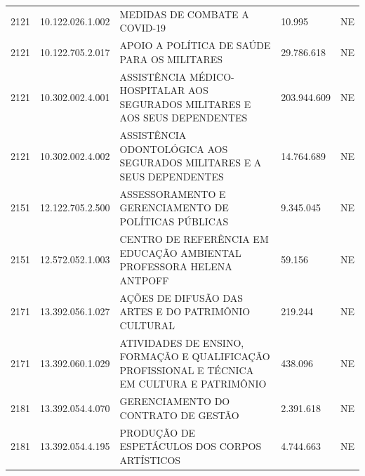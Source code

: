 \documentclass{article}
\begin{document}
\begin{longtable}[c]{m{1cm}|m{2cm}|m{10cm}|m{2cm}|m{1cm}}
\multicolumn{1}{C{1cm}|}{2121} & \multicolumn{1}{C{2cm}|}{10.122.026.1.002} & \multicolumn{1}{L{10cm}|}{MEDIDAS DE COMBATE A COVID-19} & \multicolumn{1}{R{2cm}|}{10.995} & \multicolumn{1}{C{1cm}}{NE} \\
\multicolumn{1}{C{1cm}|}{2121} & \multicolumn{1}{C{2cm}|}{10.122.705.2.017} & \multicolumn{1}{L{10cm}|}{APOIO A POLÍTICA DE SAÚDE PARA OS MILITARES} & \multicolumn{1}{R{2cm}|}{29.786.618} & \multicolumn{1}{C{1cm}}{NE} \\
\multicolumn{1}{C{1cm}|}{2121} & \multicolumn{1}{C{2cm}|}{10.302.002.4.001} & \multicolumn{1}{L{10cm}|}{ASSISTÊNCIA MÉDICO-HOSPITALAR AOS SEGURADOS MILITARES E AOS SEUS DEPENDENTES} & \multicolumn{1}{R{2cm}|}{203.944.609} & \multicolumn{1}{C{1cm}}{NE} \\
\multicolumn{1}{C{1cm}|}{2121} & \multicolumn{1}{C{2cm}|}{10.302.002.4.002} & \multicolumn{1}{L{10cm}|}{ASSISTÊNCIA ODONTOLÓGICA AOS SEGURADOS MILITARES E A SEUS DEPENDENTES} & \multicolumn{1}{R{2cm}|}{14.764.689} & \multicolumn{1}{C{1cm}}{NE} \\
\multicolumn{1}{C{1cm}|}{2151} & \multicolumn{1}{C{2cm}|}{12.122.705.2.500} & \multicolumn{1}{L{10cm}|}{ASSESSORAMENTO E GERENCIAMENTO DE POLÍTICAS PÚBLICAS} & \multicolumn{1}{R{2cm}|}{9.345.045} & \multicolumn{1}{C{1cm}}{NE} \\
\multicolumn{1}{C{1cm}|}{2151} & \multicolumn{1}{C{2cm}|}{12.572.052.1.003} & \multicolumn{1}{L{10cm}|}{CENTRO DE REFERÊNCIA EM EDUCAÇÃO AMBIENTAL PROFESSORA HELENA ANTPOFF} & \multicolumn{1}{R{2cm}|}{59.156} & \multicolumn{1}{C{1cm}}{NE} \\
\multicolumn{1}{C{1cm}|}{2171} & \multicolumn{1}{C{2cm}|}{13.392.056.1.027} & \multicolumn{1}{L{10cm}|}{AÇÕES DE DIFUSÃO DAS ARTES E DO PATRIMÔNIO CULTURAL} & \multicolumn{1}{R{2cm}|}{219.244} & \multicolumn{1}{C{1cm}}{NE} \\
\multicolumn{1}{C{1cm}|}{2171} & \multicolumn{1}{C{2cm}|}{13.392.060.1.029} & \multicolumn{1}{L{10cm}|}{ATIVIDADES DE ENSINO, FORMAÇÃO E QUALIFICAÇÃO PROFISSIONAL E TÉCNICA EM CULTURA E PATRIMÔNIO} & \multicolumn{1}{R{2cm}|}{438.096} & \multicolumn{1}{C{1cm}}{NE} \\
\multicolumn{1}{C{1cm}|}{2181} & \multicolumn{1}{C{2cm}|}{13.392.054.4.070} & \multicolumn{1}{L{10cm}|}{GERENCIAMENTO DO CONTRATO DE GESTÃO} & \multicolumn{1}{R{2cm}|}{2.391.618} & \multicolumn{1}{C{1cm}}{NE} \\
\multicolumn{1}{C{1cm}|}{2181} & \multicolumn{1}{C{2cm}|}{13.392.054.4.195} & \multicolumn{1}{L{10cm}|}{PRODUÇÃO DE ESPETÁCULOS DOS CORPOS ARTÍSTICOS} & \multicolumn{1}{R{2cm}|}{4.744.663} & \multicolumn{1}{C{1cm}}{NE} \\

\end{longtable}
\end{document}
